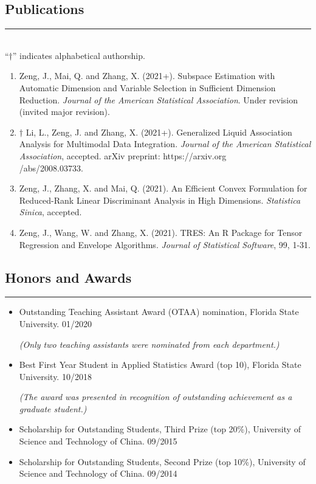 \documentclass[10pt, oneside]{article}
\begin{document}
\subsection*{Publications}
\noindent\rule{\textwidth}{1pt}\\[1mm]
``$\dagger$'' indicates alphabetical authorship.
\begin{enumerate}[itemsep=0pt]
    \item Zeng, J., Mai, Q. and Zhang, X. (2021+). Subspace Estimation with Automatic Dimension and Variable Selection in Sufficient Dimension Reduction. \textit{Journal of the American Statistical Association}. Under revision (invited major revision).
    \item $\dagger$ Li, L., Zeng, J. and Zhang, X. (2021+). Generalized Liquid Association Analysis for Multimodal Data Integration. \textit{Journal of the American Statistical Association}, accepted. arXiv preprint: https://arxiv.org\\/abs/2008.03733.
    \item Zeng, J., Zhang, X. and Mai, Q. (2021). An Efficient Convex Formulation for Reduced-Rank Linear Discriminant Analysis in High Dimensions. \textit{Statistica Sinica}, accepted.
    \item Zeng, J., Wang, W. and Zhang, X. (2021). TRES: An R Package for Tensor Regression and Envelope Algorithms. \textit{Journal of Statistical Software}, 99, 1-31.
\end{enumerate}

\subsection*{Honors and Awards}
\noindent\rule{\textwidth}{1pt}
\begin{itemize}[itemsep=-1pt]
    \item Outstanding Teaching Assistant Award (OTAA) nomination, Florida State University. \hfill 01/2020

    \vspace{-0.5mm}
    \textit{(Only two teaching assistants were nominated from each department.)}
    \item Best First Year Student in Applied Statistics Award (top 10), Florida State University. \hfill 10/2018

    \vspace{-0.5mm}
    \textit{(The award was presented in recognition of outstanding achievement as a graduate student.)}
    \item Scholarship for Outstanding Students, Third Prize (top 20\%), University of Science and Technology of China. \hfill 09/2015
    \item Scholarship for Outstanding Students, Second Prize (top 10\%), University of Science and Technology of China. \hfill 09/2014
\end{itemize}
\end{document}

